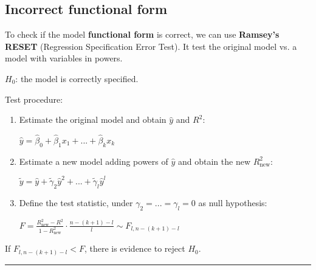 \documentclass[10pt, a4paper, landscape]{extarticle}
\begin{document}
\begin{multicols}{3}
\section*{Incorrect functional form}
	To check if the model \textbf{functional form} is correct, we can use \textbf{Ramsey's RESET} (Regression Specification Error Test). It test the original model vs. a model with variables in powers.
	\begin{center}
		$H_0$: the model is correctly specified.
	\end{center}
	Test procedure:
	\begin{enumerate}[leftmargin=*]
		\item Estimate the original model and obtain $\hat{y}$ and $R^2$:
		\begin{center}
			$\hat{y} = \hat{\beta}_0 + \hat{\beta}_1 x_1 + ... + \hat{\beta}_k x_k$
		\end{center}
		\item Estimate a new model adding powers of $\hat{y}$ and obtain the new $R^2_{\mathrm{new}}$:
		\begin{center}
			$\tilde{y} = \hat{y} + \tilde{\gamma}_2 \hat{y}^2 + ... + \tilde{\gamma}_l \hat{y}^l$
		\end{center}
		\item Define the test statistic, under $\gamma_2 = ... = \gamma_l = 0$ as null hypothesis:
		\begin{center}
			$F = \frac{R^2_{\mathrm{new}} - R^2}{1 - R^2_{\mathrm{new}}} \cdot \frac{n-(k+1)-l}{l} \sim F_{l, n-(k+1)-l}$
		\end{center}
	\end{enumerate}
	If $F_{l, n-(k+1)-l} < F$, there is evidence to reject $H_0$.
\end{multicols}

\noindent\rule{\textwidth}{0.4pt} %
\end{document}
